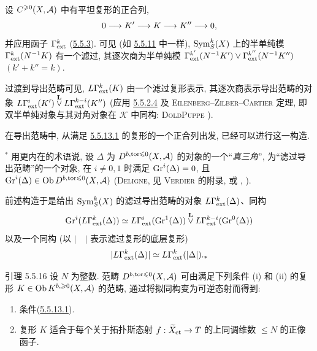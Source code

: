 \subsubsection{}
设 $C^{\geqslant0}(X,{\mathcal A})$ 中有平坦复形的正合列,
$$
0\longrightarrow K'\longrightarrow K\longrightarrow K''\longrightarrow0{},
$$
并应用函子 $\Gamma^k_{\operatorname{ext}}$ (\hyperref[XVII.subsubsec5.5.3]{5.5.3}). 可见 (如 \hyperref[XVII.subsubsec5.5.11]{5.5.11} 中一样), $\operatorname{Sym}^k_S(X)$ 上的半单纯模 $\Gamma^k_{\operatorname{ext}}(N^{-1}K)$ 有一个滤过, 其\pageoriginale 逐次商为半单纯模 $\Gamma^{k'}_{\operatorname{ext}}(N^{-1}K')\vee
\Gamma^{k''}_{\operatorname{ext}}(N^{-1}K'')$ $(k'+k''=k)$.

过渡到导出范畴可见, $L\Gamma^k_{\operatorname{ext}}(K)$ 由一个滤过复形表示, 其逐次商表示导出范畴的对象 $L\Gamma^i_{\operatorname{ext}}(K')\overset{\mathbf{L}}{\vee}
L\Gamma^{k-i}_{\operatorname{ext}}(K'')$ (应用 \hyperref[XVII.par5.5.2.4]{5.5.2.4} 及 \textsc{Eilenberg--Zilber--Cartier} 定理, 即双半单纯对象与其对角对象在 $\mathcal K$ 中同构: \textsc{Dold\sisi{ }{-}Puppe} \cite[2.9 ]{sga4.exp.XVII.bib.DP}).

在导出范畴中, 从满足 \hyperref[XVII.par5.5.13.1]{5.5.13.1} 的复形的一个正合列出发, 已经可以进行这一构造.

${}^{\ast}$ 用更内在的术语说, 设 $\Delta$ 为 $D^{b,\operatorname{tor}\leqslant0}(X,{\mathcal A})$ 的对象的一个“\emph{真三角}”, \ie 为“滤过导出范畴”的一个对象, 在 $i\neq0,1$ 时满足 $\operatorname{Gr}^i(\Delta)=0$, 且 $\operatorname{Gr}^i(\Delta)\in\operatorname{Ob} D^{b,\operatorname{tor}\leqslant0}(X,{\mathcal A})$ (\textsc{Deligne}, 见 \textsc{Verdier} \cite{sga4.exp.XVII.bib.V2} 的附录, 或 , ).

前述构造于是给出 $\operatorname{Sym}^k_S(X)$ 的滤过导出范畴的对象 $L\Gamma^k_{\operatorname{ext}}(\Delta)$、同构
\[
\operatorname{Gr}^i(L\Gamma^k_{\operatorname{ext}}(\Delta))\simeq
L\Gamma^i_{\operatorname{ext}}(\operatorname{Gr}^1(\Delta))\overset{\mathbf{L}}{\vee}
L\Gamma^{k-i}_{\operatorname{ext}}(\operatorname{Gr}^0(\Delta))
\]
以及一个同构 (以 $\lvert\quad\rvert$ 表示滤过复形的底层复形)
\[
\lvert L\Gamma^k_{\operatorname{ext}}(\Delta)\rvert\simeq
L\Gamma^k_{\operatorname{ext}}(\lvert\Delta\rvert){}.{}_{\ast}
\]

\begin{enonce*}{引理 5.5.16}
设 $N$ 为整数. 范畴 $D^{b,\operatorname{tor}\leqslant0}(X,{\mathcal A})$ 可由满足下列条件 {\rm(i)} 和 {\rm(ii)} 的复形 $K\in\operatorname{Ob} K^{b,\geqslant0}(X,{\mathcal A})$ 的范畴, 通过将拟同构变为可逆态射而得到:
\begin{enumerate}
\renewcommand{\theenumi}{\roman{enumi}}
\renewcommand{\labelenumi}{(\theenumi)}
\item 条件\pageoriginale (\hyperref[XVII.par5.5.13.1]{5.5.13.1}).

\item 复形 $K$ 适合于每个关于拓扑斯态射 $f:\widetilde X_{\text{\rm et}}\rightarrow T$ 的上同调维数 $\leq N$ 的正像函子.
\end{enumerate}
\end{enonce*}


